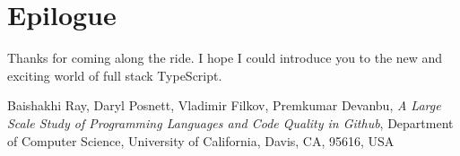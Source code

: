 \documentclass[12pt,a4paper]{report}
\begin{document}
\chapter{Epilogue}

Thanks for coming along the ride. I hope I could introduce you to the new and exciting world of full stack TypeScript.

\begin{thebibliography}{9}

  Baishakhi Ray, Daryl Posnett, Vladimir Filkov, Premkumar Devanbu,
  \textit{A Large Scale Study of Programming Languages
and Code Quality in Github},
  Department of Computer Science, University of California, Davis, CA, 95616, USA

\end{thebibliography}
\end{document}
